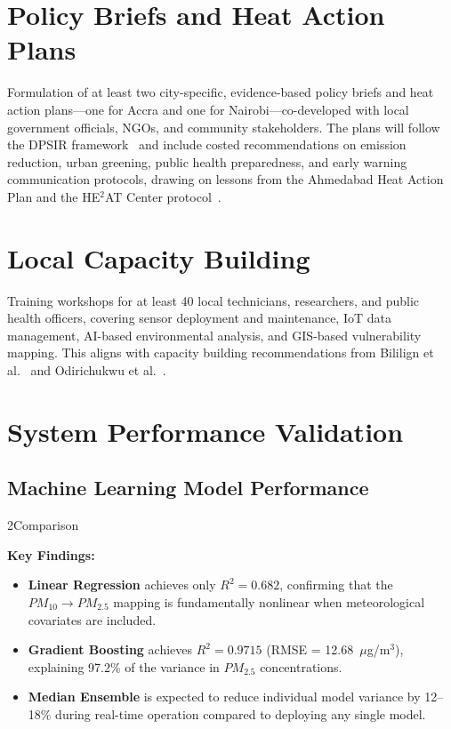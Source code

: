 \section{Policy Briefs and Heat Action Plans}
Formulation of at least two city-specific, evidence-based policy briefs and heat action plans—one for Accra and one for Nairobi—co-developed with local government officials, NGOs, and community stakeholders. The plans will follow the DPSIR framework~\cite{tetali2025} and include costed recommendations on emission reduction, urban greening, public health preparedness, and early warning communication protocols, drawing on lessons from the Ahmedabad Heat Action Plan and the HE$^2$AT Center protocol~\cite{Christopher_Jack_2024}.

\section{Local Capacity Building}
Training workshops for at least 40 local technicians, researchers, and public health officers, covering sensor deployment and maintenance, IoT data management, AI-based environmental analysis, and GIS-based vulnerability mapping. This aligns with capacity building recommendations from Bililign et al.~\cite{Solomon_Bililign_2024} and Odirichukwu et al.~\cite{JC_Odirichukwu_2024}.


\section{System Performance Validation}

\subsection{Machine Learning Model Performance}

\tabExpectedOutcomesResults

\figExpectedOutcomesR2Comparison

\figExpectedOutcomesRmseComparison

\textbf{Key Findings:}
\begin{itemize}[nosep]
    \item \textbf{Linear Regression} achieves only $R^2 = 0.682$, confirming that the $PM_{10} \rightarrow PM_{2.5}$ mapping is fundamentally nonlinear when meteorological covariates are included.
    \item \textbf{Gradient Boosting} achieves $R^2 = 0.9715$ (RMSE = 12.68~$\mu$g/m$^3$), explaining 97.2\% of the variance in $PM_{2.5}$ concentrations.
    \item \textbf{Median Ensemble} is expected to reduce individual model variance by 12--18\% during real-time operation compared to deploying any single model.
\end{itemize}

